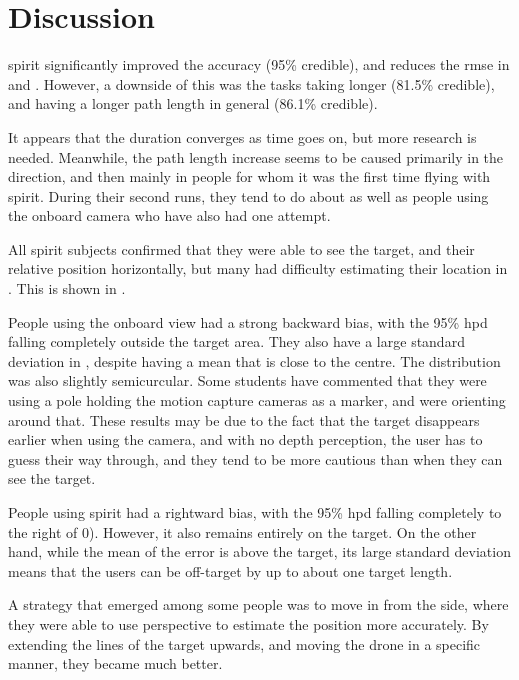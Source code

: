 \chapter{Discussion}
\gls{spirit} significantly improved the accuracy (95\% credible), and reduces the \gls{rmse} in  and .
However, a downside of this was the tasks taking longer (81.5\% credible), and having a longer path length in general (86.1\% credible).

It appears that the duration converges as time goes on, but more research is needed.
Meanwhile, the path length increase seems to be caused primarily in the  direction, and then mainly in people for whom it was the first time flying with \gls{spirit}.
During their second runs, they tend to do about as well as people using the onboard camera who have also had one attempt.

All \gls{spirit} subjects confirmed that they were able to see the target, and their relative position horizontally, but many had difficulty estimating their location in .
This is shown in .

People using the onboard view had a strong backward bias, with the 95\% \gls{hpd} falling completely outside the target area.
They also have a large standard deviation in , despite having a mean that is close to the centre.
The distribution was also slightly semicurcular.
Some students have commented that they were using a pole holding the motion capture cameras as a marker, and were orienting around that.
These results may be due to the fact that the target disappears earlier when using the camera, and with no depth perception, the user has to guess their way through, and they tend to be more cautious than when they can see the target.

People using \gls{spirit} had a rightward bias, with the 95\% \gls{hpd} falling completely to the right of 0).
However, it also remains entirely on the target.
On the other hand, while the mean of the  error is above the target, its large standard deviation means that the users can be off-target by up to about one target length.

A strategy that emerged among some people was to move in from the side, where they were able to use perspective to estimate the position more accurately.
By extending the lines of the target upwards, and moving the drone in a specific manner, they became much better.


